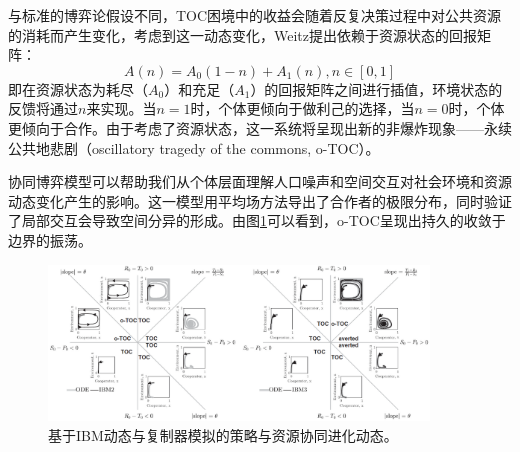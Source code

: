 与标准的博弈论假设不同，TOC困境中的收益会随着反复决策过程中对公共资源的消耗而产生变化，考虑到这一动态变化，Weitz提出依赖于资源状态的回报矩阵：
\[A(n)=A_0(1-n)+A_1(n), n\in [0,1]\]
即在资源状态为耗尽（$A_0$）和充足（$A_1$）的回报矩阵之间进行插值，环境状态的反馈将通过$n$来实现。当$n=1$时，个体更倾向于做利己的选择，当$n=0$时，个体更倾向于合作。由于考虑了资源状态，这一系统将呈现出新的非爆炸现象——永续公共地悲剧（oscillatory tragedy of the commons, o-TOC）。

协同博弈模型可以帮助我们从个体层面理解人口噪声和空间交互对社会环境和资源动态变化产生的影响。这一模型用平均场方法导出了合作者的极限分布，同时验证了局部交互会导致空间分异的形成。由图\ref{conevol}可以看到，o-TOC呈现出持久的收敛于边界的振荡。

\begin{figure}
	\label{conevol}
	\centering
	\includegraphics[width=0.9\textwidth]{pictures/Coevolutionary}
	\caption{基于IBM动态与复制器模拟的策略与资源协同进化动态。}
\end{figure}

